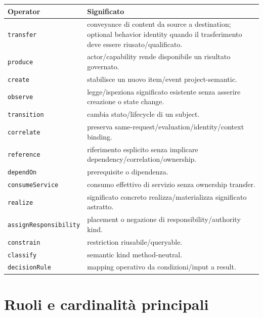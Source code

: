 \documentclass[11pt,a4paper]{article}
\newcommand{\code}[1]{\nolinkurl{#1}}
\begin{document}
\begin{longtable}{L{0.22\textwidth}L{0.66\textwidth}}
\toprule
\textbf{Operator} & \textbf{Significato} \\
\midrule\endhead
\code{transfer} & conveyance di content da source a destination; optional behavior identity quando il trasferimento deve essere riusato/qualificato. \\
\code{produce} & actor/capability rende disponibile un risultato governato. \\
\code{create} & stabilisce un nuovo item/event project-semantic. \\
\code{observe} & legge/ispeziona significato esistente senza asserire creazione o state change. \\
\code{transition} & cambia stato/lifecycle di un subject. \\
\code{correlate} & preserva same-request/evaluation/identity/context binding. \\
\code{reference} & riferimento esplicito senza implicare dependency/correlation/ownership. \\
\code{dependOn} & prerequisite o dipendenza. \\
\code{consumeService} & consumo effettivo di servizio senza ownership transfer. \\
\code{realize} & significato concreto realizza/materializza significato astratto. \\
\code{assignResponsibility} & placement o negazione di responsibility/authority kind. \\
\code{constrain} & restriction riusabile/queryable. \\
\code{classify} & semantic kind method-neutral. \\
\code{decisionRule} & mapping operativo da condizioni/input a result. \\
\bottomrule
\end{longtable}

\section{Ruoli e cardinalità principali}
\end{document}
